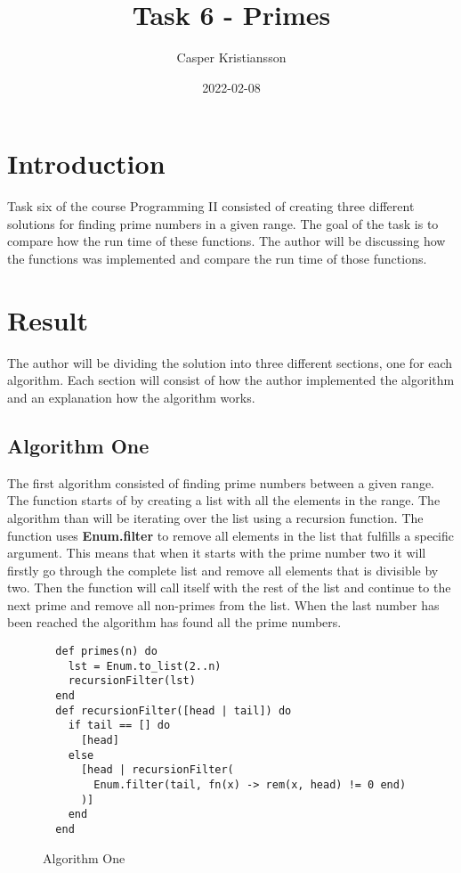 \documentclass[a4paper,11pt]{article}
\begin{document}
\title{
    \textbf{Task 6 - Primes}
}
\author{Casper Kristiansson}
\date{2022-02-08}

\maketitle

\section*{Introduction}
Task six of the course Programming II consisted of creating three different solutions for finding prime numbers in a given range. The goal of the task is to compare how the run time of these functions. The author will be discussing how the functions was implemented and compare the run time of those functions.

\section*{Result}
The author will be dividing the solution into three different sections, one for each algorithm. Each section will consist of how the author implemented the algorithm and an explanation how the algorithm works.

\subsection*{Algorithm One}
The first algorithm consisted of finding prime numbers between a given range. The function starts of by creating a list with all the elements in the range. The algorithm than will be iterating over the list using a recursion function. The function uses \textbf{Enum.filter} to remove all elements in the list that fulfills a specific argument. This means that when it starts with the prime number two it will firstly go through the complete list and remove all elements that is divisible by two. Then the function will call itself with the rest of the list and continue to the next prime and remove all non-primes from the list. When the last number has been reached the algorithm has found all the prime numbers.

\begin{figure}[H]
\begin{verbatim}
  def primes(n) do
    lst = Enum.to_list(2..n)
    recursionFilter(lst)
  end
  def recursionFilter([head | tail]) do
    if tail == [] do
      [head]
    else
      [head | recursionFilter(
        Enum.filter(tail, fn(x) -> rem(x, head) != 0 end)
      )]
    end
  end
\end{verbatim}
\caption{Algorithm One}
\label{Figure:1}
\end{figure}
\end{document}
